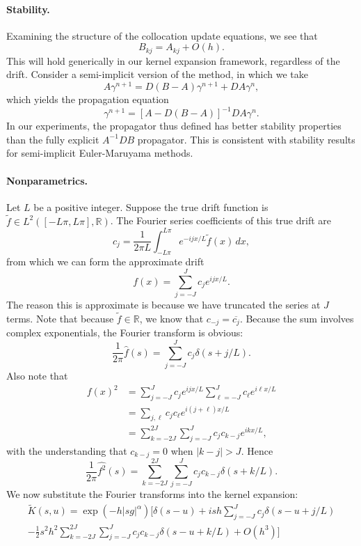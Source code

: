 \documentclass[11pt,letterpaper]{article}
\begin{document}
\paragraph{Stability.} Examining the structure of the collocation update equations, we see that
\[
B_{kj} = A_{kj} + O(h).
\]
This will hold generically in our kernel expansion framework, regardless of the drift.  Consider a semi-implicit version of the method, in which we take
\[
A \gamma^{n+1} = D (B - A) \gamma^{n+1} + D A \gamma^n,
\]
which yields the propagation equation
\[
\gamma^{n+1} = \left[ A - D(B-A) \right]^{-1} D A \gamma^n.
\]
In our experiments, the propagator thus defined has better stability properties than the fully explicit $A^{-1} D B$ propagator. This is consistent with stability results for semi-implicit Euler-Maruyama methods.

\paragraph{Nonparametrics.} Let $L$ be a positive integer. Suppose the true drift function is $\widetilde{f} \in L^2([-L\pi,L\pi],\mathbb{R})$.  The Fourier series coefficients of this true drift are
\[
c_j = \frac{1}{2 \pi L} \int_{-L\pi}^{L\pi} e^{-i j x/L} \widetilde{f}(x) \, dx,
\]
from which we can form the approximate drift
\[
f(x) = \sum_{j=-J}^J c_j e^{i j x/L}.
\]
The reason this is approximate is because we have truncated the series at $J$ terms.
Note that because $\tilde{f} \in \mathbb{R}$, we know that $c_{-j} = \overline{c_j}$. Because the sum involves complex exponentials, the Fourier transform is obvious:
\[
\frac{1}{2 \pi} \widehat{f}(s) = \sum_{j=-J}^J c_j \delta(s + j/L).
\]
Also note that
\begin{align*}
f(x)^2 &= \sum_{j=-J}^J c_j e^{i j x/L} \sum_{\ell=-J}^J c_{\ell} e^{i \ell x/L} \\
 &= \sum_{j,\ell} c_j c_{\ell} e^{i (j + \ell) x/L} \\
 &= \sum_{k=-2J}^{2J} \sum_{j=-J}^J c_j c_{k-j} e^{i k x/L},
\end{align*}
with the understanding that $c_{k-j} = 0$ when $|k-j| > J$.  Hence
\[
\frac{1}{2 \pi} \widehat{f^2} (s) = \sum_{k=-2J}^{2J} \sum_{j=-J}^J c_j c_{k-j}  \delta(s + k/L).
\]
We now substitute the Fourier transforms into the kernel expansion:
\begin{multline}
 \label{eqn:nonparke}
 \widetilde{K}(s,u) = \exp{\left(  -h |s g|^{\alpha} \right)} \biggl[ \delta(s-u) + i s h \sum_{j=-J}^J c_j \delta(s - u + j/L) \\ - \frac{1}{2} s^2 h^2 \sum_{k=-2J}^{2J} \sum_{j=-J}^J c_j c_{k-j}  \delta(s - u + k/L) + O(h^3) \biggr]
 \end{multline}
\end{document}
